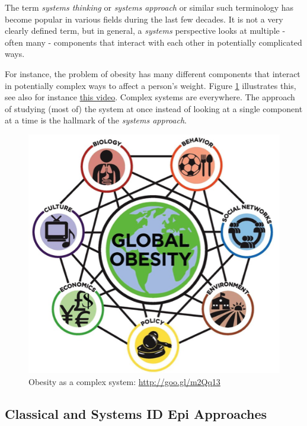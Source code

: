 \documentclass[]{article}
\theoremstyle{definition}
\theoremstyle{definition}
\theoremstyle{definition}
\theoremstyle{remark}
\begin{document}
The term \emph{systems thinking} or \emph{systems approach} or similar
such terminology has become popular in various fields during the last
few decades. It is not a very clearly defined term, but in general, a
\emph{systems} perspective looks at multiple - often many - components
that interact with each other in potentially complicated ways.

For instance, the problem of obesity has many different components that
interact in potentially complex ways to affect a person's weight. Figure
\ref{fig:obesitysystem} illustrates this, see also for instance
\href{https://youtu.be/2vojPksdbtI}{this video}. Complex systems are
everywhere. The approach of studying (most of) the system at once
instead of looking at a single component at a time is the hallmark of
the \emph{systems approach}.

\begin{figure}
\centering
\includegraphics{./images/complexsystem.png}
\caption{\label{fig:obesitysystem}Obesity as a complex system:
\url{http://goo.gl/m2Qq13}}
\end{figure}

\subsection{Classical and Systems ID Epi
Approaches}\label{classical-and-systems-id-epi-approaches}
\end{document}
